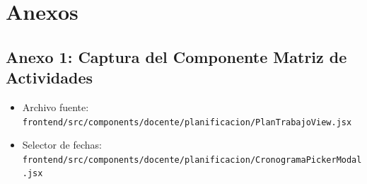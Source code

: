 \documentclass[12pt,a4paper]{article}
\begin{document}
\vspace{0.4cm}

\section{Anexos}
\subsection*{Anexo 1: Captura del Componente Matriz de Actividades}
\begin{itemize}[leftmargin=1.5em, itemsep=1.5pt]
    \item Archivo fuente: \texttt{frontend/src/components/docente/planificacion/PlanTrabajoView.jsx}
    \item Selector de fechas: \texttt{frontend/src/components/docente/planificacion/CronogramaPickerModal.jsx}
\end{itemize}
\end{document}
